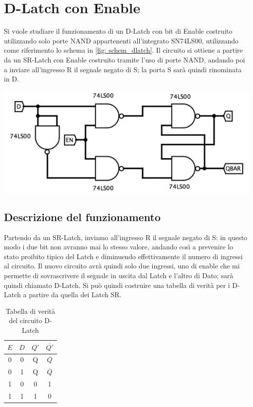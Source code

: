 \documentclass[10pt, a4paper, italian]{article}
\begin{document}
\section{D-Latch con Enable}
\begin{minipage}{0.7\textwidth}
Si vuole studiare il funzionamento di un D-Latch con bit di Enable costruito utilizzando solo porte NAND appartenenti all'integrato SN74LS00, utilizzando come riferimento lo schema in \cref{fig: schem_dlatch}.
Il circuito si ottiene a partire da un SR-Latch con Enable costruito tramite l'uso di porte NAND, andando poi a inviare all'ingresso R il segnale negato di S; la porta S sarà quindi rinominata in D.
\end{minipage}
\begin{minipage}{0.3\textwidth}
	\includegraphics[width=\textwidth]{Schem_DLATCH}
\end{minipage}
\subsection{Descrizione del funzionamento}
Partendo da un SR-Latch, inviamo all'ingresso R il segnale negato di S: in questo modo i due bit non avranno mai lo stesso valore, andando così a prevenire lo stato proibito tipico del Latch e diminuendo effettivamente il numero di ingressi al circuito.
Il nuovo circuito avrà quindi solo due ingressi, uno di enable che mi permette di sovrascrivere il segnale in uscita dal Latch e l'altro di Dato; sarà quindi chiamato D-Latch.
Si può quindi costruire una tabella di verità per i D-Latch a partire da quella dei Latch SR.

\begin{table}[htbp]
\centering
\begin{tabular}{cc|cc}
\toprule
$E$ & $D$ & $Q'$ & $\overline{Q'}$ \\
\midrule
\midrule
0&0&Q&$\overline{Q}$\\
0&1&Q&$\overline{Q}$\\
1&0&0&1\\
1&1&1&0\\
\bottomrule
\end{tabular}
\caption{Tabella di verità del circuito D-Latch
\label{tab: D-Latch}}
\end{table}
\end{document}
